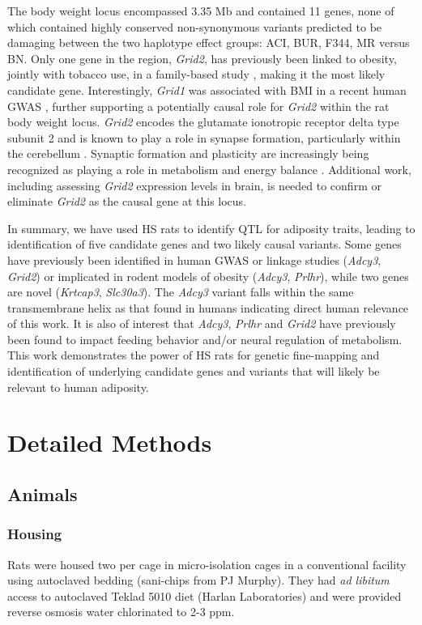 The body weight locus encompassed 3.35 Mb and contained 11 genes, none of which contained highly conserved non-synonymous variants predicted to be damaging between the two haplotype effect groups: ACI, BUR, F344, MR versus BN. Only one gene in the region, \textit{Grid2}, has previously been linked to obesity, jointly with tobacco use, in a family-based study \citep{Nikpay2012}, making it the most likely candidate gene.  Interestingly, \textit{Grid1} was associated with BMI in a recent human GWAS \citep{Locke2015}, further supporting a potentially causal role for \textit{Grid2} within the rat body weight locus. \textit{Grid2} encodes the glutamate ionotropic receptor delta type subunit 2 and is known to play a role in synapse formation, particularly within the cerebellum \citep{Hirai2003}.  Synaptic formation and plasticity are increasingly being recognized as playing a role in metabolism and energy balance \citep{Dietrich2013}.  Additional work, including assessing \textit{Grid2} expression levels in brain, is needed to confirm or eliminate \textit{Grid2} as the causal gene at this locus. 

In summary, we have used HS rats to identify QTL for adiposity traits, leading to identification of five candidate genes and two likely causal variants.  Some genes have previously been identified in human GWAS or linkage studies (\textit{Adcy3}, \textit{Grid2}) or implicated in rodent models of obesity (\textit{Adcy3}, \textit{Prlhr}), while two genes are novel (\textit{Krtcap3}, \textit{Slc30a3}).   The \textit{Adcy3} variant falls within the same transmembrane helix as that found in humans indicating direct human relevance of this work.   It is also of interest that \textit{Adcy3}, \textit{Prlhr} and \textit{Grid2} have previously been found to impact feeding behavior and/or neural regulation of metabolism.  This work demonstrates the power of HS rats for genetic fine-mapping and identification of underlying candidate genes and variants that will likely be relevant to human adiposity.  

\section{Detailed Methods}

\subsection{Animals}

\subsubsection{Housing} 
Rats were housed two per cage in micro-isolation cages in a conventional facility using autoclaved bedding (sani-chips from PJ Murphy). They had \textit{ad libitum} access to autoclaved Teklad 5010 diet (Harlan Laboratories) and were provided reverse osmosis water chlorinated to 2-3 ppm.

